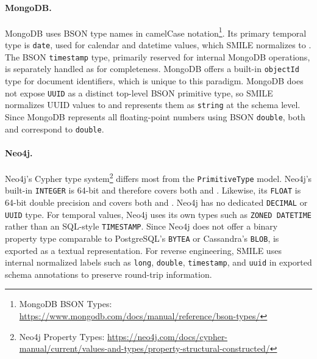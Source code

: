 \paragraph{MongoDB.}
  MongoDB uses BSON type names in camelCase notation\footnote{MongoDB BSON Types: \url{https://www.mongodb.com/docs/manual/reference/bson-types/}}.
  Its primary temporal type is \texttt{date}, used for calendar and datetime values, which SMILE normalizes to . The BSON \texttt{timestamp}
  type, primarily reserved for internal MongoDB operations, is separately handled as  for completeness. MongoDB offers a built-in
  \texttt{objectId} type for document identifiers, which is unique to this paradigm. MongoDB does not expose \texttt{UUID} as a distinct top-level
  BSON primitive type, so SMILE normalizes UUID values to  and represents them as \texttt{string} at the schema level. Since MongoDB
  represents all floating-point numbers using BSON \texttt{double}, both  and  correspond to \texttt{double}.

  \paragraph{Neo4j.}
  Neo4j's Cypher type system\footnote{Neo4j Property Types:
  \url{https://neo4j.com/docs/cypher-manual/current/values-and-types/property-structural-constructed/}} differs most from the
  \texttt{Primi\-tive\-Type} model. Neo4j's built-in \texttt{INTEGER} is 64-bit and therefore covers both  and . Likewise, its
  \texttt{FLOAT} is 64-bit double precision and covers both  and . Neo4j has no dedicated \texttt{DECIMAL} or \texttt{UUID}
  type. For temporal values, Neo4j uses its own types such as \texttt{ZONED DATETIME} rather than an SQL-style \texttt{TIMESTAMP}. Since Neo4j does
  not offer a binary property type comparable to PostgreSQL's \texttt{BYTEA} or Cassandra's \texttt{BLOB},  is exported as a textual
  representation. For reverse engineering, SMILE  uses internal normalized labels such as \texttt{long}, \texttt{double}, \texttt{timestamp}, and
  \texttt{uuid} in exported schema annotations to preserve round-trip information.

